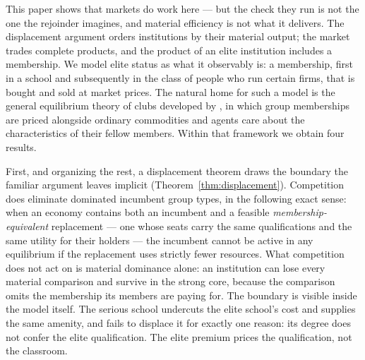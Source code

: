 \documentclass[12pt,letterpaper]{article}
\theoremstyle{definition}
\begin{document}
This paper shows that markets do work here --- but the check they run is not the one the rejoinder imagines, and material efficiency is not what it delivers.
The displacement argument orders institutions by their material output; the market trades complete products, and the product of an elite institution includes a membership.
We model elite status as what it observably is: a membership, first in a school and subsequently in the class of people who run certain firms, that is bought and sold at market prices.
The natural home for such a model is the general equilibrium theory of clubs developed by \citet{ellickson1999clubs,ellickson2001clubs,ellickson2006organization}, in which group memberships are priced alongside ordinary commodities and agents care about the characteristics of their fellow members.
Within that framework we obtain four results.

First, and organizing the rest, a displacement theorem draws the boundary the familiar argument leaves implicit (Theorem~\ref{thm:displacement}).
Competition does eliminate dominated incumbent group types, in the following exact sense: when an economy contains both an incumbent and a feasible \emph{membership-equivalent} replacement --- one whose seats carry the same qualifications and the same utility for their holders --- the incumbent cannot be active in any equilibrium if the replacement uses strictly fewer resources.
What competition does not act on is material dominance alone: an institution can lose every material comparison and survive in the strong core, because the comparison omits the membership its members are paying for.
The boundary is visible inside the model itself.
The serious school undercuts the elite school's cost and supplies the same amenity, and fails to displace it for exactly one reason: its degree does not confer the elite qualification.
The elite premium prices the qualification, not the classroom.
\end{document}
